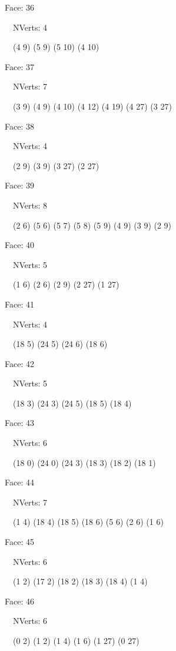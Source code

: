 \documentclass{article}
\begin{document}
{\footnotesize 

Face: 36

\   \    NVerts: 4

 \   \   (4 9) (5 9) (5 10) (4 10)}

{\footnotesize 

Face: 37

\   \    NVerts: 7

 \   \   (3 9) (4 9) (4 10) (4 12) (4 19) (4 27) (3 27)}

{\footnotesize 

Face: 38

\   \    NVerts: 4

 \   \   (2 9) (3 9) (3 27) (2 27)}

{\footnotesize 

Face: 39

\   \    NVerts: 8

 \   \   (2 6) (5 6) (5 7) (5 8) (5 9) (4 9) (3 9) (2 9)}

{\footnotesize 

Face: 40

\   \    NVerts: 5

 \   \   (1 6) (2 6) (2 9) (2 27) (1 27)}

{\footnotesize 

Face: 41

\   \    NVerts: 4

 \   \   (18 5) (24 5) (24 6) (18 6)}

{\footnotesize 

Face: 42

\   \    NVerts: 5

 \   \   (18 3) (24 3) (24 5) (18 5) (18 4)}

{\footnotesize 

Face: 43

\   \    NVerts: 6

 \   \   (18 0) (24 0) (24 3) (18 3) (18 2) (18 1)}

{\footnotesize 

Face: 44

\   \    NVerts: 7

 \   \   (1 4) (18 4) (18 5) (18 6) (5 6) (2 6) (1 6)}

{\footnotesize 

Face: 45

\   \    NVerts: 6

 \   \   (1 2) (17 2) (18 2) (18 3) (18 4) (1 4)}

{\footnotesize 

Face: 46

\   \    NVerts: 6

 \   \   (0 2) (1 2) (1 4) (1 6) (1 27) (0 27)}
\end{document}
